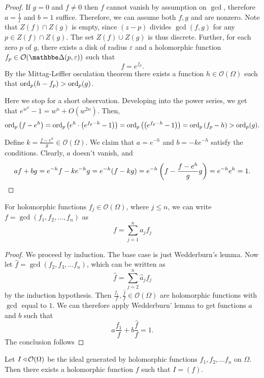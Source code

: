 \begin{proof}
If $g = 0$ and $f \neq 0$ then $f$ cannot vanish by assumption on
$\gcd$, therefore $a = \frac{1}{f}$ and $b = 1$ suffice. Therefore,
we can assume both $f, g$ and are nonzero. Note that
$Z(f) \cap Z(g)$ is empty, since $(z - p)$ divides $\gcd(f, g)$ for
any $p \in Z(f) \cap Z(g)$. The set $Z(f) \cup Z(g)$ is thus
discrete. Further, for each zero $p$ of $g$, there exists a disk of
radius $\varepsilon$ and a holomorphic function
$f_p \in \mathcal{O}(\dsk(p, \varepsilon))$ such that
\[
f = e^{f_p}.
\]
By the Mittag-Leffler osculation theorem there exists a function
$h \in \mathcal{O}(\Omega)$ such that
$\operatorname{ord}_p(h - f_p) > \operatorname{ord}_p(g)$.

Here we stop for a short observation. Developing into the power
series, we get that $e^{w^n} - 1 = w^n + O(w^{2 n})$. Then, 
\[
\operatorname{ord}_p \left(f - e^h\right) =
\operatorname{ord}_p \left(e^h \cdot \left(e^{f_p - h} - 1\right)\right) =
\operatorname{ord}_p \left(\left(e^{f_p - h} - 1\right)\right) =
\operatorname{ord}_p \left(f_p - h\right) >
\operatorname{ord}_p(g).
\]

Define $k = \frac{f - e^h}{g} \in \mathcal{O}(\Omega)$. We claim
that $a = e^{-h}$ and $b = -k e^{-h}$ satisfy the conditions.
Clearly, $a$ doesn't vanish, and
\[
a f + b g =
e^{-h} f - k e ^{-h} g =
e^{-h}(f - k g) =
e^{- h} \left(f - \frac{f - e^h}{g} g\right) =
e^{-h} e^h =
1. \qedhere
\]
\end{proof}

\begin{posledica}
For holomorphic functions $f_j \in \mathcal{O}(\Omega)$, where
$j \leq n$, we can write $f = \gcd(f_1, f_2, \dots, f_n)$ as 
\[
f = \sum_{j=1}^n a_j f_j
\]
\end{posledica}

\begin{proof}
We proceed by induction. The base case is just Wedderburn's lemma.
Now let $\hat{f} = \gcd(f_2, f_3, \dots f_n)$, which can be
written as
\[
\hat{f} = \sum_{j=2}^n \hat{a}_j f_j
\]
by the induction hypothesis. Then
$\frac{f_1}{f}, \frac{\hat{f}}{f} \in \mathcal{O}(\Omega)$ are
holomorphic functions with $\gcd$ equal to $1$. We can therefore
apply Wedderburn' lemma to get functions $a$ and $b$ such that
\[
a \frac{f_1}{f} + b \frac{\hat{f}}{f} = 1.
\]
The conclusion follows
\end{proof}

\begin{izrek}
Let $I \triangleleft \mathcal{O}(\Omega)$ be the ideal generated by
holomorphic functions $f_1, f_2, \dots f_n$ on $\Omega$. Then there
exists a holomorphic function $f$ such that $I = (f)$.
\end{izrek}

